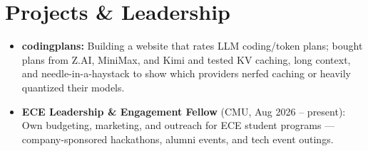 \documentclass[11pt, letterpaper]{article}
\begin{document}
\section{Projects \& Leadership}
\begin{itemize}
  \item \textbf{codingplans:} Building a website that rates LLM coding/token plans; bought plans from Z.AI, MiniMax, and Kimi and tested KV caching, long context, and needle-in-a-haystack to show which providers nerfed caching or heavily quantized their models.
  \item \textbf{ECE Leadership \& Engagement Fellow} (CMU, Aug 2026 -- present): Own budgeting, marketing, and outreach for ECE student programs --- company-sponsored hackathons, alumni events, and tech event outings.
\end{itemize}
\end{document}
